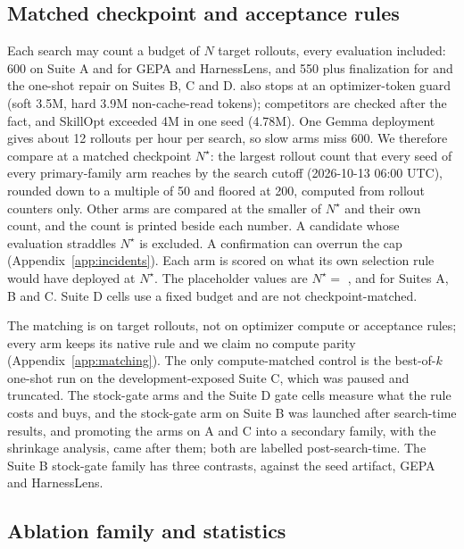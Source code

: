 \subsection{Matched checkpoint and acceptance rules}

Each search may count a budget of $N$ target rollouts, every evaluation included: 600 on Suite A and for GEPA and HarnessLens, and 550 plus finalization for \capevolve{} and the one-shot repair on Suites B, C and D. \capevolve{} also stops at an optimizer-token guard (soft 3.5M, hard 3.9M non-cache-read tokens); competitors are checked after the fact, and SkillOpt exceeded 4M in one seed (4.78M). One Gemma deployment gives about 12 rollouts per hour per search, so slow arms miss 600. We therefore compare at a matched checkpoint $N^\star$: the largest rollout count that every seed of every primary-family arm reaches by the search cutoff (2026-10-13 06:00 UTC), rounded down to a multiple of 50 and floored at 200, computed from rollout counters only. Other arms are compared at the smaller of $N^\star$ and their own count, and the count is printed beside each number. A candidate whose evaluation straddles $N^\star$ is excluded. A confirmation can overrun the cap (Appendix~\ref{app:incidents}). Each arm is scored on what its own selection rule would have deployed at $N^\star$. The placeholder values are $N^\star=$ \mockBstarA{}, \mockBstarB{} and \mockBstarC{} for Suites A, B and C.  Suite D cells use a fixed budget and are not checkpoint-matched.

The matching is on target rollouts, not on optimizer compute or acceptance rules; every arm keeps its native rule and we claim no compute parity (Appendix~\ref{app:matching}). The only compute-matched control is the best-of-$k$ one-shot run on the development-exposed Suite C, which was paused and truncated. The stock-gate arms and the Suite D gate cells measure what the rule costs and buys, and the stock-gate arm on Suite B was launched after search-time results, and promoting the arms on A and C into a secondary family, with the shrinkage analysis, came after them; both are labelled post-search-time. The Suite B stock-gate family has three contrasts, against the seed artifact, GEPA and HarnessLens.

\subsection{Ablation family and statistics}
\label{sec:v2:stats}

